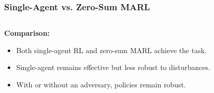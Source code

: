     \begin{frame}
  \frametitle{Single-Agent vs. Zero-Sum MARL}

  \begin{columns}[T,onlytextwidth]
    \begin{column}{0.45\textwidth}
      \small
      \textbf{Comparison:}
      \begin{itemize}\setlength{\itemsep}{3pt}
        \item Both single-agent RL and zero-sum MARL achieve the task.
        \item Single-agent remains effective but less robust to disturbances.
        \item With or without an adversary, policies remain robust.
      \end{itemize}

    \end{column}


\end{columns}
\end{frame}
